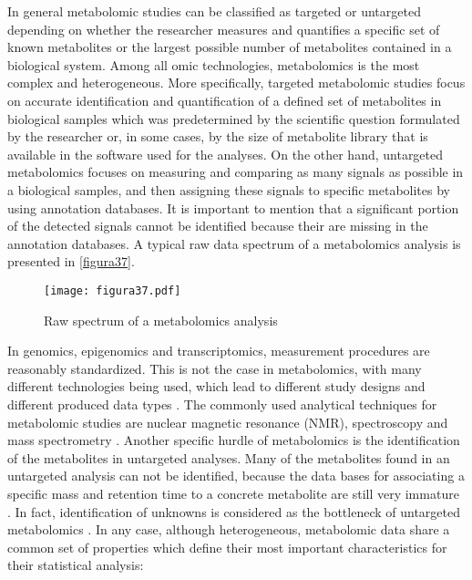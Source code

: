 In general metabolomic studies can be classified as targeted or untargeted depending on whether the researcher measures and quantifies a specific set of known metabolites or the largest possible number of metabolites contained in a biological system. 
Among all omic technologies, metabolomics is the most complex and heterogeneous. More specifically, targeted metabolomic studies focus on accurate identification and quantification of a defined set of metabolites in biological samples which was predetermined by the scientific question formulated by the researcher or, in some cases, by the size of metabolite library that is available in the software used for the analyses. On the other hand, untargeted metabolomics focuses on measuring and comparing as many signals as possible in a biological samples, and then assigning these signals to specific metabolites by using annotation databases. It is important to mention that a significant portion of the detected signals cannot be identified because their are missing in the annotation databases. A typical raw data spectrum of a metabolomics analysis is presented in \autoref{figura37}.

\begin{figure}[htbp]\centering
		\texttt{[image: figura37.pdf]}
		\caption{Raw spectrum of a metabolomics analysis}
		\label{figura37}
	\end{figure}

In genomics, epigenomics and transcriptomics, measurement procedures are reasonably standardized. This is not the case in metabolomics, with many different technologies being used, which lead to different study designs and different produced data types \parencite{moco2007metabolomics}. The commonly used analytical techniques for metabolomic studies are nuclear magnetic resonance (NMR), spectroscopy and mass spectrometry \parencite{buscher2009cross}. Another specific hurdle of metabolomics is the identification of the metabolites in untargeted analyses. Many of the metabolites found in an untargeted analysis can not be identified, because the data bases for associating a specific mass and retention time to a concrete metabolite are still very immature \parencite{mathew2013metabolomics}. In fact, identification of unknowns is considered as the bottleneck of untargeted metabolomics \parencite{bingol2018recent}.
In any case, although heterogeneous, metabolomic data share a common set of properties which define their most important characteristics for their statistical analysis:

